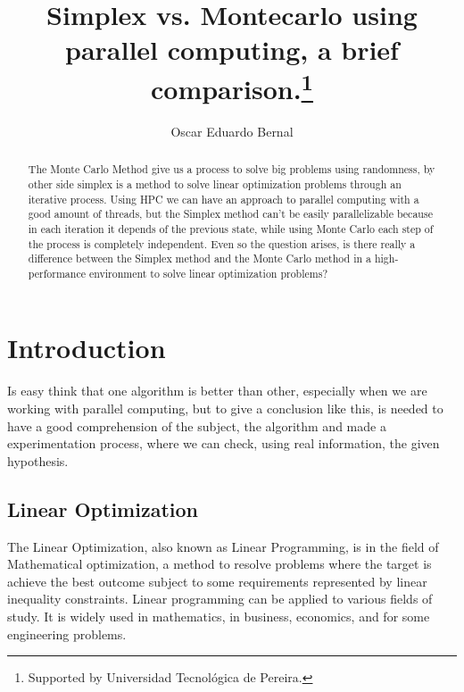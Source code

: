 \documentclass[runningheads]{llncs}
\begin{document}
\title{Simplex vs. Montecarlo using parallel computing, a brief comparison.\thanks{Supported by Universidad Tecnológica de Pereira.}}

\author{Oscar Eduardo Bernal}



\maketitle        

\begin{abstract}
The Monte Carlo Method give us a process to solve big problems using randomness, by other side simplex is a method to solve linear optimization problems through an iterative process. Using HPC we can have an approach to parallel computing with a good amount of threads, but the Simplex method can't be easily parallelizable because in each iteration it depends of the previous state, while using Monte Carlo each step of the process is completely independent. Even so the question arises, is there really a difference between the Simplex method and the Monte Carlo method in a high-performance environment to solve linear optimization problems?

\end{abstract}

\section{Introduction}
Is easy think that one algorithm is better than other, especially when we are working with parallel computing, but to give a conclusion like this, is needed to have a good comprehension of the subject, the algorithm and made a experimentation process, where we can check, using real information, the given hypothesis.

\subsection{Linear Optimization}
The Linear Optimization, also known as Linear Programming, is in the field of Mathematical optimization, a method to resolve problems where the target is achieve the best outcome subject to some requirements represented by linear inequality constraints.
Linear programming can be applied to various fields of study. It is widely used in mathematics, in business, economics, and for some engineering problems.
\end{document}
